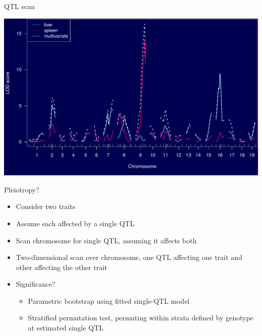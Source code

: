 \documentclass[12pt]{article}
\newcommand{\headsize}{\fontsize{35}{35} \selectfont}
\newcommand{\smallersize}{\fontsize{20}{25} \selectfont}
\begin{document}
\headsize \color{myyellow}
\hfill \begin{minipage}{5.75in}
\centering
QTL scan
\end{minipage}

\vspace{15mm}

\centerline{\includegraphics{Figs/iron_lod_mvn.pdf}}



\newpage

\headsize \color{myyellow}
\hfill \begin{minipage}{5.75in}
\centering
Pleiotropy?
\end{minipage}

\vspace{25mm}

\color{mywhite} \smallersize

\hspace{0.5in} \begin{minipage}{9.5in}

  \begin{itemize}
    \itemsep18pt

  \item Consider two traits
  \item Assume each affected by a single QTL
  \item Scan chromosome for single QTL, assuming it affects both
  \item Two-dimensional scan over chromosome, one QTL affecting one
    trait and other affecting the other trait
  \item Significance?
    {\color{myblue}
    \begin{itemize}
    \item Parametric bootstrap using fitted single-QTL model
    \item Stratified permutation test, permuting within strata
      defined by genotype at estimated single QTL
      \end{itemize} }

  \end{itemize}


\end{minipage}
\end{document}
